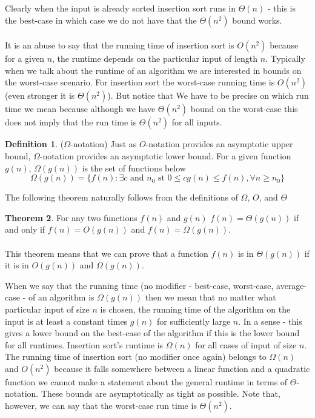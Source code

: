 \documentclass{scrartcl}
\theoremstyle{definition}
\newtheorem{theorem}{Theorem}
\theoremstyle{definition}
\newtheorem{definition}[theorem]{Definition}
\theoremstyle{remark}
\numberwithin{equation}{section}
\begin{document}
Clearly when the input is already sorted insertion sort runs in $\Theta(n)$ - this is the best-case in which case we do not have that the $\Theta(n^2)$ bound works. \\
\\
It is an abuse to say that the running time of insertion sort is $O(n^2)$ because for a given $n$, the runtime depends on the particular input of length $n$. Typically when we talk about the runtime of an algorithm we are interested in bounds on the worst-case scenario. For insertion sort the worst-case running time is $O(n^2)$ (even stronger it is $\Theta(n^2)$). But notice that We have to be precise on which run time we mean because although we have $\Theta(n^2)$ bound on the worst-case this does not imply that the run time is $\Theta(n^2)$ for all inputs.\\
\begin{definition}($\Omega$-notation)
    Just as $O$-notation provides an asymptotic upper bound, $\Omega$-notation provides an asymptotic lower bound. For a given function $g(n)$, $\Omega(g(n))$ is the set of functions below
    $$\Omega(g(n))=\{f(n):\exists c\text{ and }n_0\text{ st }0\leq cg(n)\leq f(n),\forall{n}\geq n_0\}$$
\end{definition}
The following theorem naturally follows from the definitions of $\Omega$, $O$, and $\Theta$
\begin{theorem}
    For any two functions $f(n)$ and $g(n)$ $f(n)=\Theta(g(n))$ if and only if $f(n)=O(g(n))$ and $f(n)=\Omega(g(n))$.\\ \\
    This theorem means that we can prove that a function $f(n)$ is in $\Theta(g(n))$ if it is in $O(g(n))$ and $\Omega(g(n))$.
\end{theorem}
When we say that the running time (no modifier - best-case, worst-case, average-case - of an algorithm is $\Omega(g(n))$ then we mean that no matter what particular input of size $n$ is chosen, the running time of the algorithm on the input is at least a constant times $g(n)$ for sufficiently large $n$. In a sense - this gives a lower bound on the best-case of the algorithm if this is the lower bound for all runtimes. Insertion sort's runtime is $\Omega(n)$ for all cases of input of size $n$. The running time of insertion sort (no modifier once again) belongs to $\Omega(n)$ and $O(n^2)$ because it falls somewhere between a linear function and a quadratic function we cannot make a statement about the general runtime in terms of $\Theta$-notation. These bounds are asymptotically as tight as possible. Note that, however, we can say that the worst-case run time is $\Theta(n^2)$.\\
\end{document}
